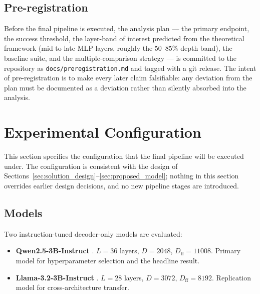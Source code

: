 \subsection{Pre-registration}
\label{subsec:preregistration}

Before the final pipeline is executed, the analysis plan — the primary
endpoint, the success threshold, the layer-band of interest predicted
from the theoretical framework (mid-to-late MLP layers, roughly the
$50$–$85\%$ depth band), the baseline suite, and the multiple-comparison
strategy — is committed to the repository as
\texttt{docs/preregistration.md} and tagged with a git release. The
intent of pre-registration is to make every later claim falsifiable: any
deviation from the plan must be documented as a deviation rather than
silently absorbed into the analysis.

\section{Experimental Configuration}
\label{sec:experimental_config}

This section specifies the configuration that the final pipeline will be
executed under. The configuration is consistent with the design of
Sections~\ref{sec:solution_design}–\ref{sec:proposed_model}; nothing in
this section overrides earlier design decisions, and no new pipeline
stages are introduced.

\subsection{Models}
\label{subsec:models}

Two instruction-tuned decoder-only models are evaluated:

\begin{itemize}[leftmargin=*]
    \item \textbf{Qwen2.5-3B-Instruct} \citep{qwen2025qwen25}. $L = 36$
          layers, $D = 2048$, $D_{\mathrm{ff}} = 11008$.
          Primary model for hyperparameter selection and the headline
          result.
    \item \textbf{Llama-3.2-3B-Instruct} \citep{grattafiori2024llama3}.
          $L = 28$ layers, $D = 3072$, $D_{\mathrm{ff}} = 8192$.
          Replication model for cross-architecture transfer.
\end{itemize}

